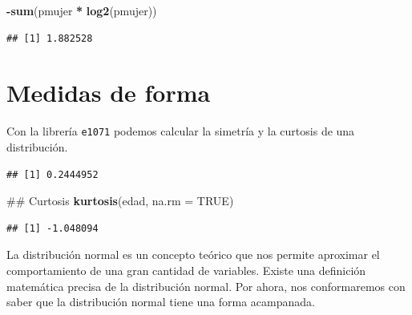 \documentclass[spanish,]{book}
\newenvironment{Shaded}{\begin{snugshade}}{\end{snugshade}}
\newcommand{\KeywordTok}[1]{\textcolor[rgb]{0.13,0.29,0.53}{\textbf{#1}}}
\newcommand{\DataTypeTok}[1]{\textcolor[rgb]{0.13,0.29,0.53}{#1}}
\newcommand{\StringTok}[1]{\textcolor[rgb]{0.31,0.60,0.02}{#1}}
\newcommand{\OtherTok}[1]{\textcolor[rgb]{0.56,0.35,0.01}{#1}}
\newcommand{\OperatorTok}[1]{\textcolor[rgb]{0.81,0.36,0.00}{\textbf{#1}}}
\newcommand{\NormalTok}[1]{#1}
\begin{document}
\begin{Shaded}
\begin{Highlighting}[]
\OperatorTok{-}\KeywordTok{sum}\NormalTok{(pmujer }\OperatorTok{*}\StringTok{ }\KeywordTok{log2}\NormalTok{(pmujer))}
\end{Highlighting}
\end{Shaded}

\begin{verbatim}
## [1] 1.882528
\end{verbatim}

\section{Medidas de forma}\label{medidas-de-forma}

Con la librería \texttt{e1071} podemos calcular la simetría y la
curtosis de una distribución.

\begin{Shaded}
\end{Shaded}

\begin{verbatim}
## [1] 0.2444952
\end{verbatim}

\begin{Shaded}
\begin{Highlighting}[]
\NormalTok{## Curtosis}
\KeywordTok{kurtosis}\NormalTok{(edad, }\DataTypeTok{na.rm =} \OtherTok{TRUE}\NormalTok{)}
\end{Highlighting}
\end{Shaded}

\begin{verbatim}
## [1] -1.048094
\end{verbatim}

La distribución normal es un concepto teórico que nos permite aproximar
el comportamiento de una gran cantidad de variables. Existe una
definición matemática precisa de la distribución normal. Por ahora, nos
conformaremos con saber que la distribución normal tiene una forma
acampanada.
\end{document}

